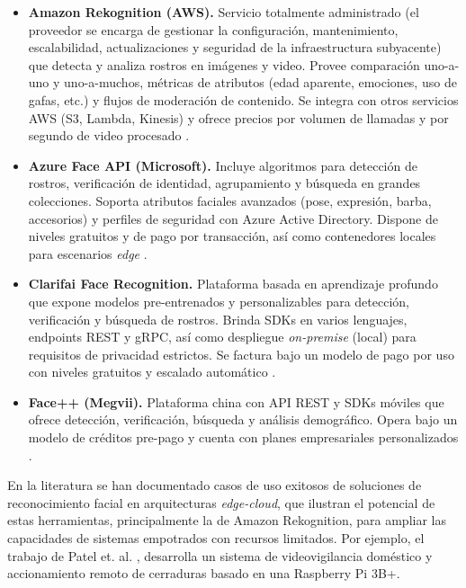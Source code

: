 \begin{itemize}
  \item \textbf{Amazon Rekognition (AWS).} Servicio totalmente administrado (el proveedor se encarga de gestionar la configuración, mantenimiento, escalabilidad, actualizaciones y seguridad de la infraestructura subyacente) que detecta y analiza rostros en imágenes y video. Provee comparación uno-a-uno y uno-a-muchos, métricas de atributos (edad aparente, emociones, uso de gafas, etc.) y flujos de moderación de contenido. Se integra con otros servicios AWS (S3, Lambda, Kinesis) y ofrece precios por volumen de llamadas y por segundo de video procesado \cite{aws_rek}.
  
  \item \textbf{Azure Face API (Microsoft).} Incluye algoritmos para detección de rostros, verificación de identidad, agrupamiento y búsqueda en grandes colecciones. Soporta atributos faciales avanzados (pose, expresión, barba, accesorios) y perfiles de seguridad con Azure Active Directory. Dispone de niveles gratuitos y de pago por transacción, así como contenedores locales para escenarios \textit{edge} \cite{azure_face}.
  
  \item \textbf{Clarifai Face Recognition.} Plataforma basada en aprendizaje profundo que expone modelos pre-entrenados y personalizables para detección, verificación y búsqueda de rostros. Brinda SDKs en varios lenguajes, endpoints REST y gRPC, así como despliegue \emph{on-premise} (local) para requisitos de privacidad estrictos. Se factura bajo un modelo de pago por uso con niveles gratuitos y escalado automático \cite{clarifai_face}.
  
  \item \textbf{Face++ (Megvii).} Plataforma china con API REST y SDKs móviles que ofrece detección, verificación, búsqueda y análisis demográfico. Opera bajo un modelo de créditos pre-pago y cuenta con planes empresariales personalizados \cite{facepp}.

\end{itemize}

En la literatura se han documentado casos de uso exitosos de soluciones de reconocimiento facial en arquitecturas \textit{edge-cloud}, que ilustran el potencial de estas herramientas, principalmente la de Amazon Rekognition, para ampliar las capacidades de sistemas empotrados con recursos limitados. Por ejemplo, el trabajo de Patel et. al. \cite{patel_image_2020}, desarrolla un sistema de videovigilancia doméstico y accionamiento remoto de cerraduras basado en una Raspberry Pi 3B+. 

